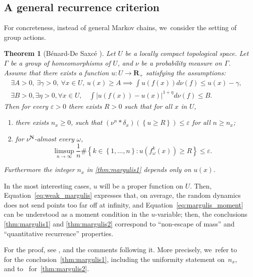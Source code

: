 \documentclass[11pt]{article}
\let\sep :
\let\e\varepsilon
\newcommand{\set}[1]{\left\{#1\right\}}
\newcommand{\abs}[1]{\left\vert#1\right\vert}
\newcommand{\unsur}[1]{\frac{1}{#1}}
\newcommand{\lrpar}[1]{\left(#1\right)}
\def\R{\mathbf{R}}
\def\N{\mathbf{N}}
\theoremstyle{plain}
\newtheorem{thm}{Theorem}[section]
\theoremstyle{definition}
\numberwithin{equation}{section}
\begin{document}
\subsection{A general recurrence criterion}
For concreteness, instead of general Mar\-kov chains, we~consider the setting of group actions.

\begin{thm}[Bénard-De Saxcé \cite{benard-desaxce}]\label{thm:margulis} Let $U$ be a locally compact topological space. Let $\Gamma$ be a group of homeomorphisms of $U$, and $\nu$ be a probability measure on $\Gamma$.
Assume that there exists a function $u:U\to \R_+$ satisfying the assumptions:
\begin{eqnarray}
\label{eq:weak_margulis}
\exists A>0, \ \exists \gamma>0, \ \forall x\in U, \ u(x)\geq A \implies
\int u(f(x))d\nu(f) \leq u(x) - \gamma, \\
\label{eq:margulis_moment}
\exists B>0, \exists \eta>0, \forall x\in U, \quad \int \abs{u(f(x)) - u(x) } ^{1+\eta} d\nu(f) \leq B.
\end{eqnarray}
Then for every $\e>0$ there exists $R>0$ such that for all $x$ in $U$,
\begin{enumerate}
\item\label{thm:margulis1} there exists $n_x\geq 0$, such that $(\nu^{n}\ast \delta_x )(\set{u\geq R}) \leq \e$ for all $n\geq n_x$;
\item\label{thm:margulis2} for $\nu^\N$-almost every $\omega$,
\[
\limsup_{n\to\infty} \unsur{n} \# \set{k\in \set{1, \ldots, n} \sep  u \lrpar{f^k_\omega(x) }\geq R} \leq \e.
\]
\end{enumerate}
Furthermore the integer $n_x$ in \eqref{thm:margulis1} depends only on $u(x)$.
\end{thm}

In the most interesting cases, $u$ will be a proper function on $U$. Then, Equation~\eqref{eq:weak_margulis}
expresses that, on average, the random dynamics does not send points too far off at infinity,
and Equation~\eqref{eq:margulis_moment} can be understood as a moment condition in the $u$\nobreakdash-vari\-able; then, the conclusions \eqref{thm:margulis1} and \eqref{thm:margulis2} correspond to ``non-escape of mass'' and ``quantitative recurrence'' properties.

For the proof, see \cite[Prop.\,1.2]{benard-desaxce}, and the comments following it. More
precisely, we~refer to~\cite[Prop.\,2.5]{benard-desaxce} for the conclusion~\eqref{thm:margulis1},
including the uniformity statement on~$n_x$, and to~\cite[Prop.\,2.7]{benard-desaxce} for~\eqref{thm:margulis2}.
\end{document}
